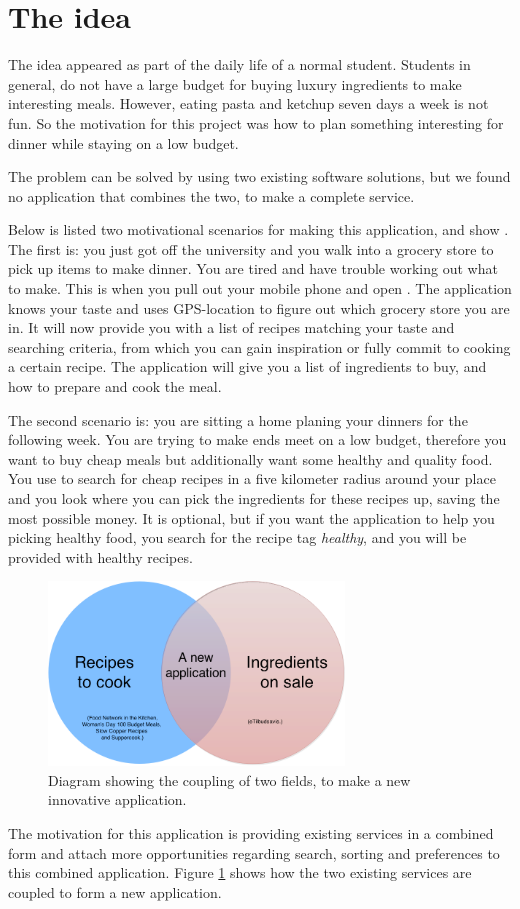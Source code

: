 \section{The idea}
\label{sec:theidea}

The idea appeared as part of the daily life of a normal student. Students in general, do not have a large budget for buying luxury ingredients to make interesting meals. However, eating pasta and ketchup seven days a week is not fun. So the motivation for this project was how to plan something interesting for dinner while staying on a low budget. 

The problem can be solved by using two existing software solutions, but we found no application that combines the two, to make a complete service.

Below is listed two motivational scenarios for making this application, and show . The first is: you just got off the university and you walk into a grocery store to pick up items to make dinner. You are tired and have trouble working out what to make. This is when you pull out your mobile phone and open . The application knows your taste and uses GPS-location to figure out which grocery store you are in. It will now provide you with a list of recipes matching your taste and searching criteria, from which you can gain inspiration or fully commit to cooking a certain recipe. The application will give you a list of ingredients to buy, and how to prepare and cook the meal.

The second scenario is: you are sitting a home planing your dinners for the following week. You are trying to make ends meet on a low budget, therefore you want to buy cheap meals but additionally want some healthy and quality food. You use  to search for cheap recipes in a five kilometer radius around your place and you look where you can pick the ingredients for these recipes up, saving the most possible money. It is optional, but if you want the application to help you picking healthy food, you search for the recipe tag \textit{healthy}, and you will be provided with healthy recipes.

\begin{figure}[H]
	\centering
	\includegraphics[width=0.7\textwidth]{Pictures/theideadiagram.png}
	\caption{Diagram showing the coupling of two fields, to make a new innovative application.}
	\label{fig:theideaasdiagram}
\end{figure}

The motivation for this application is providing existing services in a combined form and attach more opportunities regarding search, sorting and preferences to this combined application. Figure \ref{fig:theideaasdiagram} shows how the two existing services are coupled to form a new application.